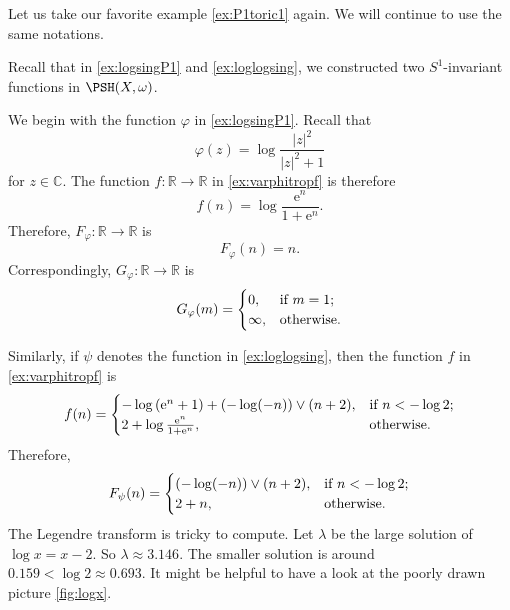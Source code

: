 \begin{example}\label{ex:FGsimplevarphi}
    Let us take our favorite example \cref{ex:P1toric1} again. We will continue to use the same notations.

    Recall that in \cref{ex:logsingP1} and \cref{ex:loglogsing}, we constructed two $S^1$-invariant functions in $\PSH(X,\omega)$.

    We begin with the function $\varphi$ in \cref{ex:logsingP1}. Recall that
    \[
    \varphi(z)=\log \frac{|z|^2}{|z|^2+1}
    \]
    for $z\in \mathbb{C}$. The function $f\colon \mathbb{R}\rightarrow \mathbb{R}$ in \eqref{ex:varphitropf} is therefore
    \[
    f(n)=\log \frac{\mathrm{e}^{n}}{1+\mathrm{e}^{n}}.
    \]
    Therefore, $F_{\varphi}\colon \mathbb{R}\rightarrow \mathbb{R}$ is
    \[
    F_{\varphi}(n)=n.
    \]
    Correspondingly, $G_{\varphi}\colon \mathbb{R}\rightarrow \mathbb{R}$ is
    \[
    G_{\varphi}(m)=
    \begin{cases}
        0,&\textup{if } m=1;\\
        \infty,&\textup{otherwise}.
    \end{cases}
    \]

    Similarly, if $\psi$ denotes the function in \cref{ex:loglogsing}, then the function $f$ in \eqref{ex:varphitropf} is
    \[
    f(n)=
    \begin{cases}
        -\log \left(\mathrm{e}^n+1 \right)+(-\log (-n))\lor (n+2),&\textup{if } n<-\log 2;\\
        2+\log \frac{\mathrm{e}^{n}}{1+\mathrm{e}^{n}},&\textup{otherwise}.
    \end{cases}
    \]
    Therefore,
    \[
    F_{\psi}(n)=
    \begin{cases}
        (-\log (-n))\lor (n+2),&\textup{if } n<-\log 2;\\
        2+n,&\textup{otherwise}.
    \end{cases}
    \]
    The Legendre transform is tricky to compute. Let $\lambda$ be the large solution of $\log x=x-2$. So $\lambda\approx 3.146$. The smaller solution is around $0.159<\log 2\approx 0.693$. It might be helpful to have a look at the poorly drawn picture \cref{fig:logx}.


\end{example}
